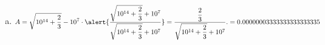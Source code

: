 \begin{frame}
\begin{solution}
\begin{enumerate}[a)]
			\item

			      \begin{equation*}
				      A=
				      \sqrt{10^{14}+\dfrac{2}{3}}-10^{7}\cdot
				      \alert{
				      \dfrac{
				      \sqrt{10^{14}+\dfrac{2}{3}}+10^{7}
				      }{
				      \sqrt{10^{14}+\dfrac{2}{3}}+10^{7}
				      }
				      }=
				      \dfrac{\dfrac{2}{3}}{
				      \sqrt{10^{14}+\dfrac{2}{3}}+10^{7}
				      }.=0.00000003333333333333335
			      \end{equation*}
		\end{enumerate}
	\end{solution}
\end{frame}
